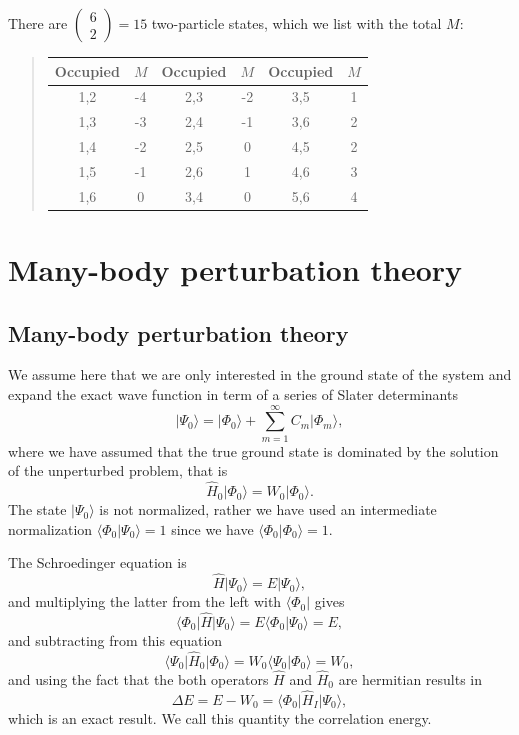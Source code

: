 \noindent
There are $\left ( \begin{array}{c} 6 \\ 2 \end{array} \right) = 15$ two-particle states, 
which we list with the total $M$:


\begin{quote}
\begin{tabular}{cccccc}
\hline
\multicolumn{1}{c}{ Occupied } & \multicolumn{1}{c}{ $M$ } & \multicolumn{1}{c}{ Occupied } & \multicolumn{1}{c}{ $M$ } & \multicolumn{1}{c}{ Occupied } & \multicolumn{1}{c}{ $M$ } \\
\hline
1,2      & -4  & 2,3      & -2  & 3,5      & 1   \\
1,3      & -3  & 2,4      & -1  & 3,6      & 2   \\
1,4      & -2  & 2,5      & 0   & 4,5      & 2   \\
1,5      & -1  & 2,6      & 1   & 4,6      & 3   \\
1,6      & 0   & 3,4      & 0   & 5,6      & 4   \\
\hline
\end{tabular}
\end{quote}


\section{Many-body perturbation theory}

\subsection{Many-body perturbation theory}

We assume here that we are only interested in the ground state of the system and 
expand the exact wave function in term of a series of Slater determinants
\[
\vert \Psi_0\rangle = \vert \Phi_0\rangle + \sum_{m=1}^{\infty}C_m\vert \Phi_m\rangle,
\]
where we have assumed that the true ground state is dominated by the 
solution of the unperturbed problem, that is
\[
\hat{H}_0\vert \Phi_0\rangle= W_0\vert \Phi_0\rangle.
\]
The state $\vert \Psi_0\rangle$ is not normalized, rather we have used an intermediate 
normalization $\langle \Phi_0 \vert \Psi_0\rangle=1$ since we have $\langle \Phi_0\vert \Phi_0\rangle=1$. 



The Schroedinger equation is
\[
\hat{H}\vert \Psi_0\rangle = E\vert \Psi_0\rangle,
\]
and multiplying the latter from the left with $\langle \Phi_0\vert $ gives
\[
\langle \Phi_0\vert \hat{H}\vert \Psi_0\rangle = E\langle \Phi_0\vert \Psi_0\rangle=E,
\]
and subtracting from this equation
\[
\langle \Psi_0\vert \hat{H}_0\vert \Phi_0\rangle= W_0\langle \Psi_0\vert \Phi_0\rangle=W_0,
\]
and using the fact that the both operators $\hat{H}$ and $\hat{H}_0$ are hermitian 
results in
\[
\Delta E=E-W_0=\langle \Phi_0\vert \hat{H}_I\vert \Psi_0\rangle,
\]
which is an exact result. We call this quantity the correlation energy.




